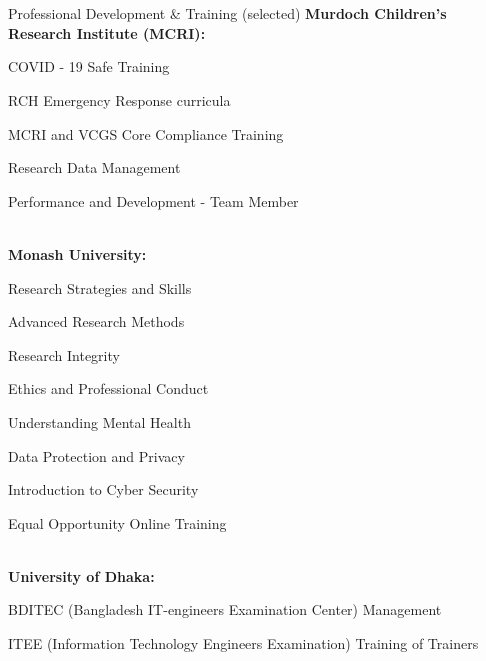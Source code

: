 \section{\faSoccerBallO}{Professional Development \& Training (selected)}
{\bf Murdoch Children's Research Institute (MCRI):} 


\begin{itemize*}[noitemsep]
    \item COVID - 19 Safe Training
    \item RCH Emergency Response curricula
    \item MCRI and VCGS Core Compliance Training
    \item Research Data Management
    \item Performance and Development - Team Member
\end{itemize*}

\noindent\\
{\bf Monash University:} 


\begin{itemize*}[noitemsep]
    \item Research Strategies and Skills
    \item Advanced Research Methods
    \item Research Integrity
    \item Ethics and Professional Conduct
    \item Understanding Mental Health
    \item Data Protection and Privacy
    \item Introduction to Cyber Security
    \item Equal Opportunity Online Training
\end{itemize*}

\noindent\\
{\bf University of Dhaka:} 


\begin{itemize*}[noitemsep]
    \item BDITEC (Bangladesh IT-engineers Examination Center) Management
    \item ITEE (Information Technology Engineers Examination) Training of Trainers
\end{itemize*}

